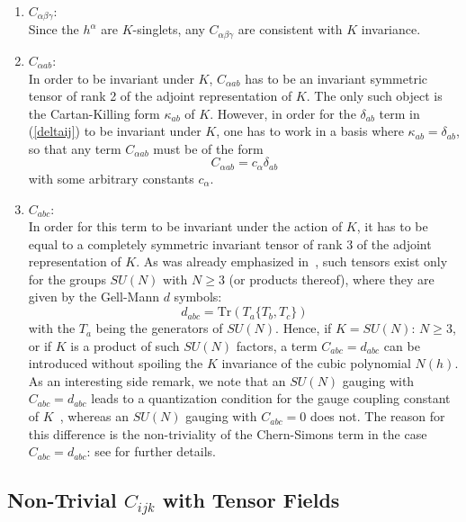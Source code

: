 \documentclass[a4paper,11pt]{article}
\begin{document}
\begin{enumerate}
\item $C_{\alpha\beta\gamma}$:\\
Since the $h^{\alpha}$ are $K$-singlets, any
$C_{\alpha\beta\gamma}$ are consistent with $K$ invariance.

\item $C_{\alpha a b}$:\\
In order to be invariant under $K$, $C_{\alpha a b}$ has to be an
invariant symmetric tensor of rank 2 of the adjoint representation
of $K$. The only such object is the Cartan-Killing form
$\kappa_{ab}$ of $K$. However, in order for the $\delta_{ab}$ term
in (\ref{deltaij}) to be invariant under $K$, one has to work in a
basis where $\kappa_{ab}=\delta_{ab}$, so that any term $C_{\alpha
a b}$ must be of the form
\begin{displaymath}
C_{\alpha ab}=c_{\alpha}\delta_{ab}
\end{displaymath}
with some arbitrary constants $c_{\alpha}$.

\item $C_{abc}$:\\
In order for this term to be invariant under the action of $K$, it
has to be equal to a completely symmetric invariant tensor of rank
3 of the adjoint representation of $K$. As was already emphasized
in~\cite{GZ1}, such tensors exist only for the groups $SU(N)$ with
$N\geq 3$ (or  products thereof), where they are given by the
Gell-Mann $d$ symbols:
\begin{displaymath}
d_{abc}=\textrm{Tr}(T_{a}\{T_{b},T_{c}\})
\end{displaymath}
with the $T_{a}$ being the generators of $SU(N)$. Hence, if
$K=SU(N)$: $N\geq 3$, or if $K$ is a product of such $SU(N)$
factors, a term $C_{abc}=d_{abc}$ can be
introduced without spoiling the $K$ invariance of the cubic
polynomial $N(h)$. As an interesting side remark, we note that an
$SU(N)$ gauging with $C_{abc}=d_{abc}$ leads to a quantization
condition for the gauge coupling constant of $K$~\cite{GST1.5},
whereas an $SU(N)$ gauging with $C_{abc}=0$ does not. The reason
for this difference is the non-triviality of the Chern-Simons term
in the case $C_{abc}=d_{abc}$: see \cite{GST1.5} for further
details.

\end{enumerate}

\subsection{Non-Trivial $C_{ijk}$ with Tensor Fields}
\end{document}
